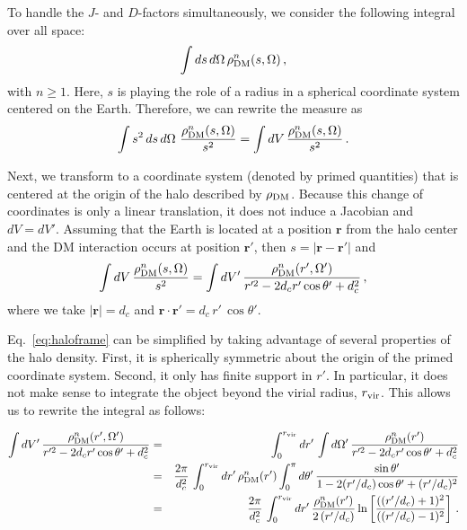 To handle the $J$- and $D$-factors simultaneously, we consider the following integral over all space:
\begin{equation}
\int ds \, d\Omega \,\rho_{\rm DM}^n(s,\Omega)\,,
\end{equation}
with $n \geq 1$. Here, $s$ is playing the role of a radius in a spherical coordinate system centered on the Earth.  Therefore, we can rewrite the measure as
\begin{equation}
\int s^2\, ds \, d\Omega \,\, \frac{\rho_{\rm DM}^n(s,\Omega)}{s^2} = \int dV\, \frac{\rho_{\rm DM}^n(s,\Omega)}{s^2}\,.
\end{equation}

Next, we transform to a coordinate system (denoted by primed quantities) that is centered at the origin of the halo described by $\rho_{\rm DM}$.  Because this change of coordinates is only a linear translation, it does not induce a Jacobian and $dV = dV'$.  Assuming that the Earth is located at a position $\mathbf{r}$ from the halo center and the DM interaction occurs at position $\mathbf{r'}$, then $s = | \mathbf{r} - \mathbf{r}'| $ and
\begin{equation}
\int dV\, \frac{\rho_{\rm DM}^n(s,\Omega)}{s^2} = \int dV'\, \frac{\rho_{\rm DM}^n(r',\Omega')}{r^{\prime 2} - 2 d_c r' \cos \theta' + d_c^2}\,,
\label{eq:haloframe}
\end{equation}
where we take $|\mathbf{r}| = d_c$ and $\mathbf{r} \cdot \mathbf{r}' = d_c\, r' \, \cos\theta'$.

Eq.~\ref{eq:haloframe} can be simplified by taking advantage of several properties of the halo density.  First, it is spherically symmetric about the origin of the primed coordinate system.  Second, it only has finite support in $r'$.  In particular, it does not make sense to integrate the object beyond the virial radius, $r_{\rm vir}$. This allows us to rewrite the integral as follows:
\vspace{0.1in}

\begin{eqnarray}
\label{eq:multiline}
\int dV'\, \frac{\rho_{\rm DM}^n(r',\Omega')}{r^{\prime 2} - 2 d_c r' \cos \theta' + d_c^2}
&=& \int_0^{r_{\rm vir}} dr'\, \int d\Omega'\, \frac{\rho_{\rm DM}^n(r')}{r^{\prime 2} - 2 d_c r' \cos \theta' + d_c^2} \\
&=& \frac{2 \pi}{d_c^2} \, \int_0^{r_{\rm vir}} dr'\, \rho_{\rm DM}^n(r')  \int_0^{\pi} d\theta'\, \frac{\sin \theta'}{1 - 2 (r'/d_c) \cos \theta' + (r'/d_c)^2} \notag \\
&=& \frac{2\pi}{d_c^2} \, \int_0^{r_{\rm vir}} dr'\, \frac{ \rho_{\rm DM}^n(r')}{2\,(r'/d_c)} \ln \left[ \frac{((r'/d_c)+1)^2}{((r'/d_c)-1)^2} \right]\,. \notag
\end{eqnarray}

